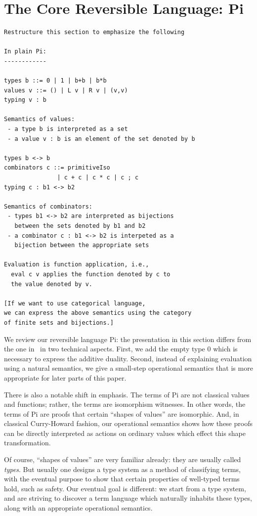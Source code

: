 \documentclass[preprint]{sigplanconf}
\begin{document}
\section{The Core Reversible Language: {{Pi}} }
\label{sec:pi}

\begin{verbatim}
Restructure this section to emphasize the following

In plain Pi: 
------------

types b ::= 0 | 1 | b+b | b*b
values v ::= () | L v | R v | (v,v)
typing v : b

Semantics of values: 
 - a type b is interpreted as a set
 - a value v : b is an element of the set denoted by b

types b <-> b
combinators c ::= primitiveIso
               | c + c | c * c | c ; c 
typing c : b1 <-> b2

Semantics of combinators:
 - types b1 <-> b2 are interpreted as bijections 
   between the sets denoted by b1 and b2
 - a combinator c : b1 <-> b2 is interpeted as a 
   bijection between the appropriate sets

Evaluation is function application, i.e., 
  eval c v applies the function denoted by c to 
  the value denoted by v.

[If we want to use categorical language, 
we can express the above semantics using the category 
of finite sets and bijections.]

\end{verbatim} 

We review our reversible language {{Pi}}: the presentation in this
section differs from the one in~\cite{infeffects} in two technical
aspects. First, we add the empty type {{0}} which is necessary to express the
additive duality. Second, instead of explaining evaluation using a natural
semantics, we give a small-step operational semantics that is more
appropriate for later parts of this paper.

There is also a notable shift in emphasis.  The terms of {{Pi}} are not
classical values and functions; rather, the terms are isomorphism 
witnesses.  In other words, the terms of {{Pi}} are proofs that certain
``shapes of values'' are isomorphic.  And, in classical Curry-Howard
fashion, our operational semantics shows how these proofs can be
directly interpreted as actions on ordinary values which effect this
shape transformation.

Of course, ``shapes of values'' are very familiar already: they are usually
called \emph{types}.  But usually one designs a type system as a method
of classifying terms, with the eventual purpose to show that certain
properties of well-typed terms hold, such as safety.  Our eventual goal
is different: we start from a type system, and are striving to discover
a term language which naturally inhabits these types, along with an
appropriate operational semantics.
\end{document}
